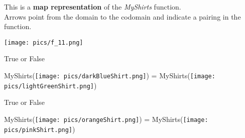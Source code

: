 \documentclass{ximera}
\author{Lee Wayand}
\begin{document}
\begin{exercise}





This is a \textbf{map representation} of the \textit{MyShirts} function. \\

Arrows point from the domain to the codomain and indicate a pairing in the function.

\begin{image}
\texttt{[image: pics/f\_11.png]}
\end{image}















\begin{question}

True or False

\begin{center}
\Huge{MyShirts(\texttt{[image: pics/darkBlueShirt.png]}) = MyShirts(\texttt{[image: pics/lightGreenShirt.png]})}
\end{center}






\begin{multipleChoice}
\end{multipleChoice}

\end{question}







\begin{question}

True or False

\begin{center}
\Huge{MyShirts(\texttt{[image: pics/orangeShirt.png]}) = MyShirts(\texttt{[image: pics/pinkShirt.png]})}
\end{center}






\begin{multipleChoice}
\end{multipleChoice}

\end{question}

















\end{exercise}
\end{document}
